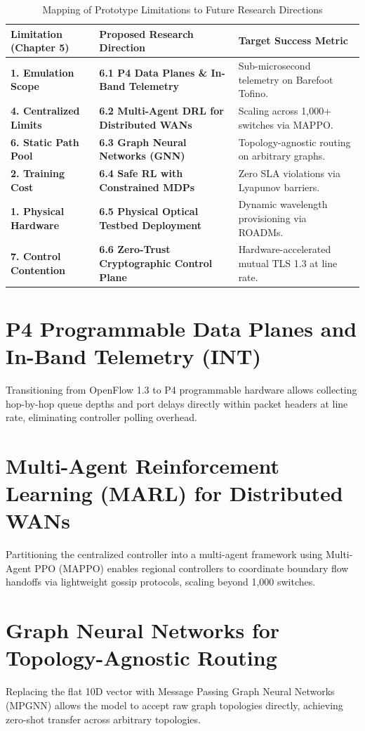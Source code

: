 \documentclass[12pt,a4paper,oneside]{report}
\begin{document}
\begin{table}[htbp]
\centering
\caption{Mapping of Prototype Limitations to Future Research Directions}
\label{tab:future_map}
\small
\begin{tabularx}{\textwidth}{l X X}
\toprule
\textbf{Limitation (Chapter 5)} & \textbf{Proposed Research Direction} & \textbf{Target Success Metric} \\
\midrule
\textbf{1. Emulation Scope} & \textbf{6.1 P4 Data Planes \& In-Band Telemetry} & Sub-microsecond telemetry on Barefoot Tofino. \\
\textbf{4. Centralized Limits} & \textbf{6.2 Multi-Agent DRL for Distributed WANs} & Scaling across 1,000+ switches via MAPPO. \\
\textbf{6. Static Path Pool} & \textbf{6.3 Graph Neural Networks (GNN)} & Topology-agnostic routing on arbitrary graphs. \\
\textbf{2. Training Cost} & \textbf{6.4 Safe RL with Constrained MDPs} & Zero SLA violations via Lyapunov barriers. \\
\textbf{1. Physical Hardware} & \textbf{6.5 Physical Optical Testbed Deployment} & Dynamic wavelength provisioning via ROADMs. \\
\textbf{7. Control Contention} & \textbf{6.6 Zero-Trust Cryptographic Control Plane} & Hardware-accelerated mutual TLS 1.3 at line rate. \\
\bottomrule
\end{tabularx}
\end{table}

\section{P4 Programmable Data Planes and In-Band Telemetry (INT)}
Transitioning from OpenFlow 1.3 to P4 programmable hardware allows collecting hop-by-hop queue depths and port delays directly within packet headers at line rate, eliminating controller polling overhead.

\section{Multi-Agent Reinforcement Learning (MARL) for Distributed WANs}
Partitioning the centralized controller into a multi-agent framework using Multi-Agent PPO (MAPPO) enables regional controllers to coordinate boundary flow handoffs via lightweight gossip protocols, scaling beyond 1,000 switches.

\section{Graph Neural Networks for Topology-Agnostic Routing}
Replacing the flat 10D vector with Message Passing Graph Neural Networks (MPGNN) allows the model to accept raw graph topologies directly, achieving zero-shot transfer across arbitrary topologies.
\end{document}
